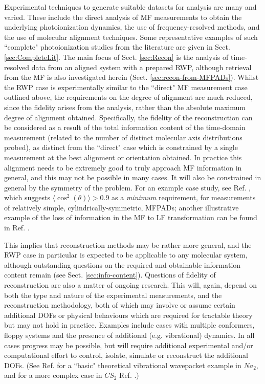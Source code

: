 \documentclass[10pt]{article}
\begin{document}
Experimental techniques to generate suitable datasets for analysis are many and varied. These include the direct analysis of MF measurements to obtain the underlying photoionization dynamics, the use of frequency-resolved methods, and the use of molecular alignment techniques. Some representative examples of such ``complete" photoionization studies from the literature are given in Sect. \ref{sec:CompleteLit}. %
The main focus of Sect. \ref{sec:Recon} is the analysis of time-resolved data from an aligned system with a prepared RWP, although retrieval from the MF is also investigated herein (Sect. \ref{sec:recon-from-MFPADs}). Whilst the RWP case is experimentally similar to the ``direct" MF measurement case outlined above, the requirements on the degree of alignment are much reduced, since the fidelity arises from the analysis, rather than the absolute maximum degree of alignment obtained. Specifically, the fidelity of the reconstruction can be considered as a result of the total information content of the time-domain measurement (related to the number of distinct molecular axis distributions probed), as distinct from the ``direct" case which is constrained by a single measurement at the best alignment or orientation obtained. In practice this alignment needs to be extremely good to truly approach MF information in general, and this may not be possible in many cases. It will also be constrained in general by the symmetry of the problem. For an example case study, see Ref. \cite{reid2018AccessingMolecularFramea}, which suggests $\langle\cos^2(\theta)\rangle>0.9$ as a \textit{minimum} requirement, for measurements of relatively simple, cylindrically-symmetric, MFPADs; another illustrative example of the loss of information in the MF to LF transformation can be found in Ref. \cite{Underwood2000}.

This implies that reconstruction methods may be rather more general, and the RWP case in particular is expected to be applicable to any molecular system, although outstanding questions on the required and obtainable information content remain (see Sect. \ref{sec:info-content}). Questions of fidelity of reconstruction are also a matter of ongoing research. This will, again, depend on both the type and nature of the experimental measurements, and the reconstruction methodology, both of which may involve or assume certain additional DOFs or physical behaviours which are required for tractable theory but may not hold in practice. Examples include cases with multiple conformers, floppy systems and the presence of additional (e.g. vibrational) dynamics. In all cases progress may be possible, but will require additional experimental and/or computational effort to control, isolate, simulate or reconstruct the additional DOFs. (See Ref. \cite{Takatsuka2000} for a ``basic" theoretical vibrational wavepacket example in $Na_2$, and for a more complex case in $CS_2$ Ref. \cite{wang2017MonitoringNonadiabaticDynamics}.)
\end{document}
